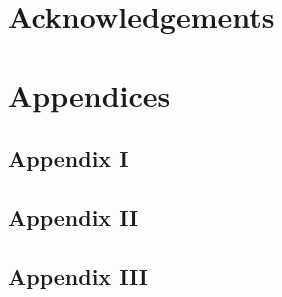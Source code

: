 \documentclass[11pt]{article}
\begin{document}
\section{Acknowledgements}

\clearpage

\appendix
\section{Appendices}
\subsection{Appendix I}
\label{appendix::example1}


\subsection{Appendix II}
\label{appendix::ms_df}


\subsection{Appendix III}
\label{appendix::ms_design}


\cleardoublepage
{}
%


\end{document}
